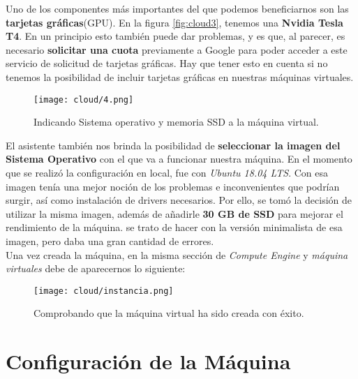 \documentclass[11pt,fleqn]{book} %
\begin{document}
Uno de los componentes más importantes del que podemos beneficiarnos son las \textbf{tarjetas gráficas}(GPU). En la figura \ref{fig:cloud3}, tenemos una \textbf{Nvidia Tesla T4}. En un principio esto también puede dar problemas, y es que, al parecer, es necesario \textbf{solicitar una cuota} previamente a Google para poder acceder a este servicio de solicitud de tarjetas gráficas. Hay que tener esto en cuenta si no tenemos la posibilidad de incluir tarjetas gráficas en nuestras máquinas virtuales.\cite{article:cuota} \\

\begin{figure}[H]
	\centering\texttt{[image: cloud/4.png]}
	\caption{Indicando Sistema operativo y memoria SSD a la máquina virtual.}
	\label{fig:cloud4} %
\end{figure} 

El asistente también nos brinda la posibilidad de \textbf{seleccionar la imagen del Sistema Operativo} con el que va a funcionar nuestra máquina. En el momento que se realizó la configuración en local, fue con \textit{Ubuntu 18.04 LTS}. Con esa imagen tenía una mejor noción de los problemas e inconvenientes que podrían surgir, así como instalación de drivers necesarios. Por ello, se tomó la decisión de utilizar la misma imagen, además de añadirle \textbf{30 GB de SSD} para mejorar el rendimiento de la máquina. se trato de hacer con la versión minimalista de esa imagen, pero daba una gran cantidad de errores. \\

Una vez creada la máquina, en la misma sección de \textit{Compute Engine} y \textit{máquina virtuales} debe de aparecernos lo siguiente:

\begin{figure}[H]
	\centering\texttt{[image: cloud/instancia.png]}
	\caption{Comprobando que la máquina virtual ha sido creada con éxito.}
	\label{fig:cloudinstancia} %
\end{figure} 

\section{Configuración de la Máquina}\label{sec:configuracionmaquina}
\end{document}
